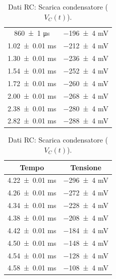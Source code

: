 \documentclass[a4paper]{article}
\begin{document}
\begin{appendices}
\begin{table}[htbp]
\begin{minipage}{0.48\textwidth}
\begin{tabular}{|c|c|}
        \num{860 \pm 1} \si{\micro\second} & \num{-196 \pm 4} \si{\milli\volt} \\
        \num{1.02 \pm 0.01} \si{\milli\second} & \num{-212 \pm 4} \si{\milli\volt} \\ %
        \num{1.30 \pm 0.01} \si{\milli\second} & \num{-236 \pm 4} \si{\milli\volt} \\
        \num{1.54 \pm 0.01} \si{\milli\second} & \num{-252 \pm 4} \si{\milli\volt} \\
        \num{1.72 \pm 0.01} \si{\milli\second} & \num{-260 \pm 4} \si{\milli\volt} \\
        \num{2.00 \pm 0.01} \si{\milli\second} & \num{-268 \pm 4} \si{\milli\volt} \\
        \num{2.38 \pm 0.01} \si{\milli\second} & \num{-280 \pm 4} \si{\milli\volt} \\
        \num{2.82 \pm 0.01} \si{\milli\second} & \num{-288 \pm 4} \si{\milli\volt} \\
        \hline
        \end{tabular}
        \caption{Dati RC: Scarica condensatore ($V_C(t)$).}
        \label{tab:rc_data_scarica_c}
    \end{minipage}\hfill %
    \begin{minipage}{0.48\textwidth}
        \centering\small %
        \begin{tabular}{|c|c|}
        \hline
        Tempo & Tensione \\\hline\hline
        \num{4.22 \pm 0.01} \si{\milli\second} & \num{-296 \pm 4} \si{\milli\volt} \\
        \num{4.26 \pm 0.01} \si{\milli\second} & \num{-272 \pm 4} \si{\milli\volt} \\
        \num{4.34 \pm 0.01} \si{\milli\second} & \num{-228 \pm 4} \si{\milli\volt} \\
        \num{4.38 \pm 0.01} \si{\milli\second} & \num{-208 \pm 4} \si{\milli\volt} \\
        \num{4.42 \pm 0.01} \si{\milli\second} & \num{-184 \pm 4} \si{\milli\volt} \\
        \num{4.50 \pm 0.01} \si{\milli\second} & \num{-148 \pm 4} \si{\milli\volt} \\
        \num{4.54 \pm 0.01} \si{\milli\second} & \num{-128 \pm 4} \si{\milli\volt} \\
        \num{4.58 \pm 0.01} \si{\milli\second} & \num{-108 \pm 4} \si{\milli\volt} \\

\end{tabular}
\end{minipage}
\end{table}
\end{appendices}
\end{document}
